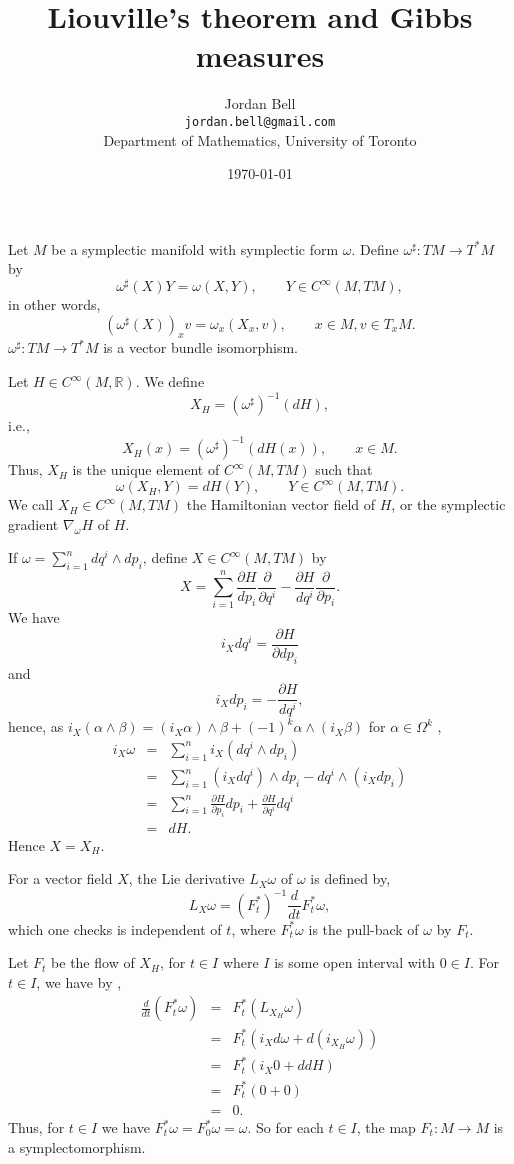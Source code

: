 \documentclass{article}
\begin{document}
\title{Liouville's theorem and Gibbs measures}
\author{Jordan Bell\\ \texttt{jordan.bell@gmail.com}\\Department of Mathematics, University of Toronto}
\date{\today}

\maketitle


Let $M$ be a symplectic manifold with symplectic form $\omega$. Define $\omega^\sharp:TM \to T^*M$
by
\[
\omega^\sharp(X)Y=\omega(X,Y), \qquad Y \in C^\infty(M,TM),
\]
in other words,
\[
(\omega^\sharp(X))_x v=\omega_x(X_x,v),\qquad x\in M, v \in T_x M.
\]
$\omega^\sharp:TM \to T^*M$ is a vector bundle isomorphism.

Let $H \in C^\infty(M,\mathbb{R})$. We define
\[
X_H=(\omega^\sharp)^{-1}(dH),
\]
i.e.,
\[
X_H(x)=(\omega^\sharp)^{-1}(dH(x)), \qquad x \in M.
\]
Thus, $X_H$ is the unique element of $C^\infty(M,TM)$ such that
\[
\omega(X_H,Y)=dH(Y), \qquad Y \in C^\infty(M,TM).
\]
We call $X_H \in C^\infty (M,TM)$ the Hamiltonian vector field of $H$, or the symplectic gradient $\nabla_\omega H$ of $H$.

If $\omega=\sum_{i=1}^n dq^i \wedge dp_i$, define $X \in C^\infty(M,TM)$ by
\[
X=\sum_{i=1}^n \frac{\partial H}{dp_i} \frac{\partial}{\partial q^i } -\frac{\partial H}{dq^i} \frac{\partial}{\partial p_i}.
\]
We have
\[
i_X dq^i=\frac{\partial H}{\partial dp_i}
\]
and
\[
i_X dp_i=-\frac{\partial H}{dq^i},
\]
hence, as $i_X(\alpha \wedge \beta)=(i_X \alpha) \wedge \beta + (-1)^k \alpha \wedge (i_X \beta)$ for $\alpha \in \Omega^k$ \cite[p.~115, Theorem 2.4.13]{foundations},
\begin{eqnarray*}
i_X \omega&=&\sum_{i=1}^n i_X ( dq^i \wedge dp_i)\\
&=&\sum_{i=1}^n (i_X dq^i) \wedge dp_i - dq^i \wedge (i_X dp_i)\\
&=&\sum_{i=1}^n \frac{\partial H}{\partial p_i} dp_i +\frac{\partial H}{\partial q^i} dq^i\\
&=&dH.
\end{eqnarray*}
Hence $X=X_H$.

For a vector field $X$, the Lie derivative $L_X \omega$ of $\omega$ is defined by, 
\[
L_X \omega= (F_t^*)^{-1} \frac{d}{dt} F_t^* \omega,
\]
which one checks is independent of $t$, where $F_t^* \omega$ is the pull-back of $\omega$ by $F_t$.

Let $F_t$ be the flow of $X_H$, for $t \in I$ where $I$ is some open interval with $0 \in I$. For $t \in I$, we have by \cite[p.~115, Theorem 2.3.13]{foundations},
\begin{eqnarray*}
\frac{d}{dt} \left( F_t^* \omega \right)&=&F_t^*\left( L_{X_H} \omega\right)\\
&=&F_t^* \left( i_X d\omega + d(i_{X_H} \omega) \right)\\
&=&F_t^*(i_X 0 + ddH)\\
&=&F_t^*(0+0)\\
&=&0.
\end{eqnarray*}
Thus, for $t \in I$ we have $F_t^* \omega=F_0^* \omega=\omega$. So for each $t \in I$,  the map $F_t:M \to M$ is a symplectomorphism.
\end{document}
